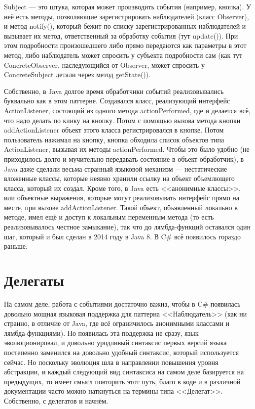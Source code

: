 \documentclass[a5paper]{article}
\begin{document}
Subject --- это штука, которая может производить события (например, кнопка). У неё есть методы, позволяющие зарегистрировать наблюдателей (класс Observer), и метод notify(), который бежит по списку зарегистрированных наблюдателей и вызывает их метод, ответственный за обработку события (тут update()). При этом подробности произошедшего либо прямо передаются как параметры в этот метод, либо наблюдатель может спросить у субъекта подробности сам (как тут ConcreteObserver, наследующийся от Observer, может спросить у ConcreteSubject детали через метод getState()).

Собственно, в Java долгое время обработчики событий реализовывались буквально как в этом паттерне. Создавался класс, реализующий интерфейс ActionListener, состоящий из одного метода actionPerformed, где и делается всё, что надо делать по клику на кнопку. Потом с помощью вызова метода кнопки addActionListener объект этого класса регистрировался в кнопке. Потом пользователь нажимал на кнопку, кнопка обходила список объектов типа ActionListener, вызывая их методы actionPerformed. Чтобы это было удобно (не приходилось долго и мучительно передавать состояние в объект-обработчик), в Java даже сделали весьма странный языковой механизм --- нестатические вложенные классы, которые неявно хранили ссылку на объект объемлющего класса, который их создал. Кроме того, в Java есть <<анонимные классы>>, или объектные выражения, которые могут реализовывать интерфейс прямо на месте, при вызове addActionListener. Такой объект, объявленный локально в методе, имел ещё и доступ к локальным переменным метода (то есть реализовывалось честное замыкание), так что до лямбда-функций оставался один шаг, который и был сделан в 2014 году в Java 8. В C\# всё появилось гораздо раньше.

\section{Делегаты}

На самом деле, работа с событиями достаточно важна, чтобы в C\# появилась довольно мощная языковая поддержка для паттерна <<Наблюдатель>> (как ни странно, в отличие от Java, где всё ограничилось анонимными классами и лямбда-функциями). Но появилась эта поддержка не сразу, язык эволюционировал, и довольно уродливый синтаксис первых версий языка постепенно заменился на довольно удобный синтаксис, который используется сейчас. Но поскольку эволюция шла в направлении повышения уровня абстракции, и каждый следующий вид синтаксиса на самом деле базируется на предыдущих, то имеет смысл повторить этот путь, благо в коде и в различной документации часто можно наткнуться на термины типа <<Делегат>>. Собственно, с делегатов и начнём.
\end{document}
